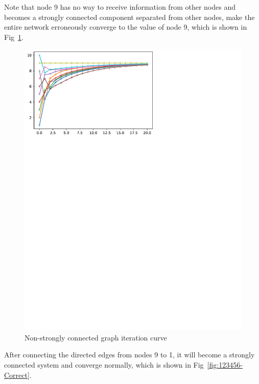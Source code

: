 \documentclass[conference]{IEEEtran}
\begin{document}
Note that node 9 has no way to receive information from other nodes and becomes a strongly connected component separated from other nodes, make the entire network erroneously converge to the value of node 9, which is shown in Fig~\ref{fig:123456-Error}.

\begin{figure}[htbp]
    \centering
    \includegraphics[width=\columnwidth]{123456-Error.pdf}
    \caption{Non-strongly connected graph iteration curve}
    \label{fig:123456-Error}
\end{figure}

After connecting the directed edges from nodes 9 to 1, it will become a strongly connected system and converge normally, which is shown in Fig~\ref{fig:123456-Correct}.
\end{document}
